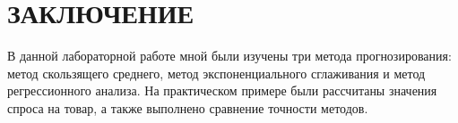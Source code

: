 \section*{ЗАКЛЮЧЕНИЕ}

В данной лабораторной работе мной были изучены три метода прогнозирования:
метод скользящего среднего, метод экспоненциального сглаживания
и метод регрессионного анализа.
На практическом примере были рассчитаны значения спроса на товар,
а также выполнено сравнение точности методов.
